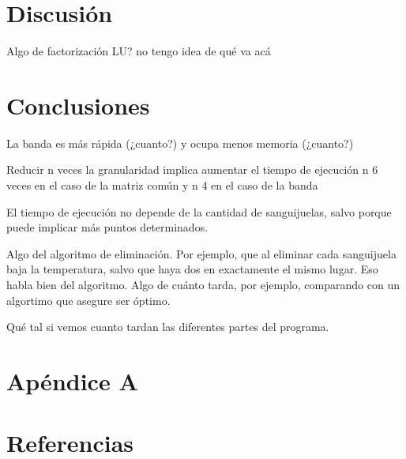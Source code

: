 \documentclass[spanish,a4paper]{article}
\begin{document}
\section{Discusi\'{o}n}

Algo de factorización LU? no tengo idea de qué va acá

\section{Conclusiones}
La banda es más rápida (¿cuanto?) y ocupa menos memoria (¿cuanto?) %

Reducir n veces la granularidad implica aumentar el tiempo de ejecución n%
6 veces en el caso de la matriz común y n%
4 en el caso de la banda %

El tiempo de ejecución no depende de la cantidad de sanguijuelas, salvo porque puede implicar más puntos determinados.

Algo del algoritmo de eliminación. Por ejemplo, que al eliminar cada sanguijuela baja la temperatura, salvo que haya dos en exactamente el mismo lugar. Eso habla bien del algoritmo. Algo de cuánto tarda, por ejemplo, comparando con un algortimo que asegure ser óptimo.

Qué tal si vemos cuanto tardan las diferentes partes del programa. %


\section{Apéndice A}


\section{Referencias}


\end{document}
